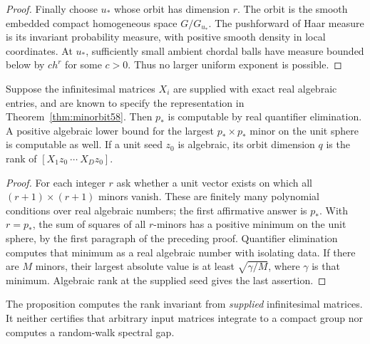 \begin{proof}
Finally choose $u_*$ whose orbit has dimension $r$. The orbit is the
smooth embedded compact homogeneous space $G/G_{u_*}$. The pushforward
of Haar measure is its invariant probability measure, with positive
smooth density in local coordinates. At $u_*$, sufficiently small
ambient chordal balls have measure bounded below by $c h^r$ for some
$c>0$. Thus no larger uniform exponent is possible.
\end{proof}

\begin{proposition}\label{prop:rankcompute58}
Suppose the infinitesimal matrices $X_i$ are supplied with exact real
algebraic entries, and are known to specify the representation in
Theorem~\ref{thm:minorbit58}. Then $p_*$ is computable by real quantifier
elimination. A positive algebraic lower bound for the largest
$p_*\times p_*$ minor on the unit sphere is computable as well. If a unit
seed $z_0$ is algebraic, its orbit dimension $q$ is the rank of
$[X_1z_0\ \cdots\ X_Dz_0]$.
\end{proposition}
\begin{proof}
For each integer $r$ ask whether a unit vector exists on which all
$(r+1)\times(r+1)$ minors vanish. These are finitely many polynomial
conditions over real algebraic numbers; the first affirmative answer is
$p_*$. With $r=p_*$, the sum of squares of all $r$-minors has a positive
minimum on the unit sphere, by the first paragraph of the preceding
proof. Quantifier elimination computes that minimum as a real algebraic
number with isolating data. If there are $M$ minors, their largest
absolute value is at least $\sqrt{\gamma/M}$, where $\gamma$ is that minimum. Algebraic rank at the supplied seed gives the last assertion.
\end{proof}
The proposition computes the rank invariant from \emph{supplied}
infinitesimal matrices. It neither certifies that arbitrary input matrices
integrate to a compact group nor computes a random-walk spectral gap.

